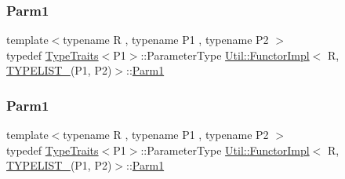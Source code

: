\mbox{\label{classUtil_1_1FunctorImpl_3_01R_00_01TYPELIST__2_07P1_00_01P2_08_4_a74b37eda530bf33969c4a0eadc2596a5}} 
\subsubsection{\texorpdfstring{Parm1}{Parm1}\hspace{0.1cm}{\footnotesize\ttfamily [2/3]}}
{\footnotesize\ttfamily template$<$typename R , typename P1 , typename P2 $>$ \\
typedef \mbox{\hyperlink{classUtil_1_1TypeTraits}{Type\+Traits}}$<$P1$>$\+::Parameter\+Type \mbox{\hyperlink{classUtil_1_1FunctorImpl}{Util\+::\+Functor\+Impl}}$<$ R, \mbox{\hyperlink{adat__devel__install_2include_2adat_2typelist_8h_a311cb99af993804c6737ae46c5cbfaff}{T\+Y\+P\+E\+L\+I\+S\+T\+\_}}(P1, P2)$>$\+::\mbox{\hyperlink{structUtil_1_1Private_1_1FunctorImplBase_a9d61e693d6c616dea5bd9d9073c7d21a}{Parm1}}}

\mbox{\label{classUtil_1_1FunctorImpl_3_01R_00_01TYPELIST__2_07P1_00_01P2_08_4_a74b37eda530bf33969c4a0eadc2596a5}} 
\subsubsection{\texorpdfstring{Parm1}{Parm1}\hspace{0.1cm}{\footnotesize\ttfamily [3/3]}}
{\footnotesize\ttfamily template$<$typename R , typename P1 , typename P2 $>$ \\
typedef \mbox{\hyperlink{classUtil_1_1TypeTraits}{Type\+Traits}}$<$P1$>$\+::Parameter\+Type \mbox{\hyperlink{classUtil_1_1FunctorImpl}{Util\+::\+Functor\+Impl}}$<$ R, \mbox{\hyperlink{adat__devel__install_2include_2adat_2typelist_8h_a311cb99af993804c6737ae46c5cbfaff}{T\+Y\+P\+E\+L\+I\+S\+T\+\_}}(P1, P2)$>$\+::\mbox{\hyperlink{structUtil_1_1Private_1_1FunctorImplBase_a9d61e693d6c616dea5bd9d9073c7d21a}{Parm1}}}

